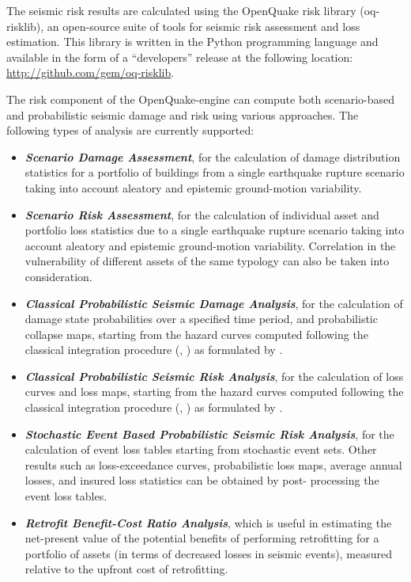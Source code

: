 
The seismic risk results are calculated using the OpenQuake risk library
(oq-risklib), an open-source suite of tools for seismic risk assessment and
loss estimation. This library is written in the Python programming language
and available in the form of a ``developers'' release at the following location:
\href{http://github.com/gem/oq-risklib}{http://github.com/gem/oq-risklib}.

The risk component of the OpenQuake-engine can compute both scenario-based and
probabilistic seismic damage and risk using various approaches. The following
types of analysis are currently supported:

\begin{itemize}

    \item \textit{\textbf{Scenario Damage Assessment}}, for the
	calculation of damage distribution statistics for a portfolio of buildings
	from a single earthquake rupture scenario taking into account aleatory and
	epistemic ground-motion variability.

    \item \textit{\textbf{Scenario Risk Assessment}}, for the calculation of
	individual asset and portfolio loss statistics due to a single earthquake
	rupture scenario taking into account aleatory and epistemic ground-motion
	variability. Correlation in the vulnerability of different assets of the
	same typology can also be taken into consideration.

	\item \textit{\textbf{Classical Probabilistic Seismic Damage Analysis}}, for 
	the calculation of damage state probabilities over a specified time period,  
	and probabilistic collapse maps, starting from the hazard curves 
	computed following the classical integration procedure (\cite{cornell1968}, 
	\citet{mcguire1976}) as formulated by \cite{field2003}.

    \item \textit{\textbf{Classical Probabilistic Seismic Risk Analysis}}, for the
	calculation of loss curves and loss maps, starting from the hazard curves 
	computed following the classical integration procedure (\cite{cornell1968}, 
	\citet{mcguire1976}) as formulated by \cite{field2003}.

	\item \textit{\textbf{Stochastic Event Based Probabilistic Seismic Risk Analysis}}, 
	for the calculation of event loss tables starting from stochastic event sets.
	Other results such as loss-exceedance curves, probabilistic loss maps, 
	average annual losses, and insured loss statistics can be obtained by post-
	processing the event loss tables.

    \item \textit{\textbf{Retrofit Benefit-Cost Ratio Analysis}}, which is
	useful in estimating the net-present value of the potential benefits of
	performing retrofitting for a portfolio of assets (in terms of decreased
	losses in seismic events), measured relative to the upfront cost of
	retrofitting.

\end{itemize}

